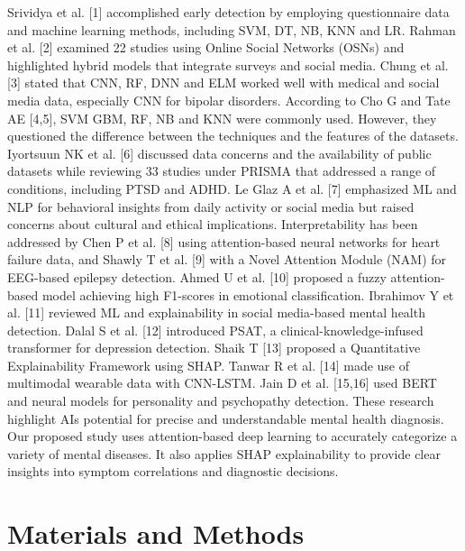 \documentclass[conference]{IEEEtran}
\begin{document}
Srividya et al. {[}1{]} accomplished early detection by employing questionnaire data and machine learning methods, including SVM, DT, NB, KNN and LR. Rahman et al. {[}2{]} examined 22 studies using Online Social Networks (OSNs) and highlighted hybrid models that integrate surveys and social media. Chung et al. {[}3{]} stated that CNN, RF, DNN and ELM worked well with medical and social media data, especially CNN for bipolar disorders. According to Cho G and Tate AE {[}4,5{]}, SVM GBM, RF, NB and KNN were commonly used. However, they questioned the difference between the techniques and the features of the datasets. Iyortsuun NK et al. {[}6{]} discussed data concerns and the availability of public datasets while reviewing 33 studies under PRISMA that addressed a range of conditions, including PTSD and ADHD. Le Glaz A et al. {[}7{]} emphasized ML and NLP for behavioral insights from daily activity or social media but raised concerns about cultural and ethical implications. Interpretability has been addressed by Chen P et al. {[}8{]} using attention-based neural networks for heart failure data, and Shawly T et al. {[}9{]} with a Novel Attention Module (NAM) for EEG-based epilepsy detection. Ahmed U et al. {[}10{]} proposed a fuzzy attention-based model achieving high F1-scores in emotional classification. Ibrahimov Y et al. {[}11{]} reviewed ML and explainability in social media-based mental health detection. Dalal S et al. {[}12{]} introduced PSAT, a clinical-knowledge-infused transformer for depression detection. Shaik T {[}13{]} proposed a Quantitative Explainability Framework using SHAP. Tanwar R et al. {[}14{]} made use of multimodal wearable data with CNN-LSTM. Jain D et al. {[}15,16{]} used BERT and neural models for personality and psychopathy detection. These research highlight AI\textquotesingle s potential for precise and understandable mental health diagnosis. Our proposed study uses attention-based deep learning to accurately categorize a variety of mental diseases. It also applies SHAP explainability to provide clear insights into symptom correlations and diagnostic decisions.

\section{Materials and Methods}
\end{document}
